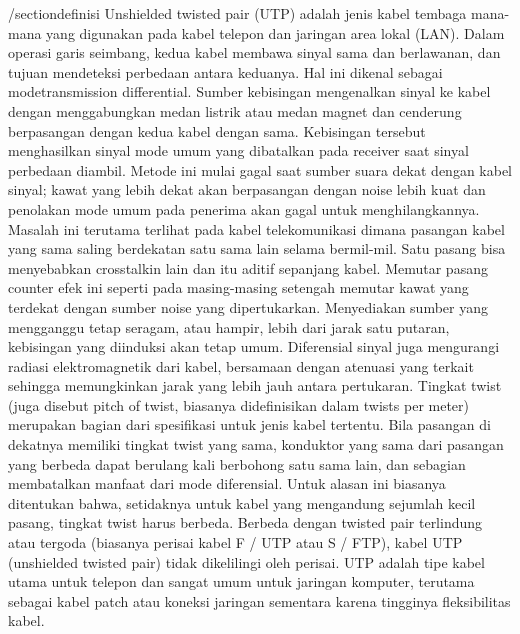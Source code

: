 /section{definisi}
Unshielded twisted pair (UTP) adalah jenis kabel tembaga mana-mana yang digunakan pada kabel telepon dan jaringan area lokal (LAN).
Dalam operasi garis seimbang, kedua kabel membawa sinyal sama dan berlawanan, dan tujuan mendeteksi perbedaan antara keduanya. Hal ini dikenal sebagai modetransmission differential. Sumber kebisingan mengenalkan sinyal ke kabel dengan menggabungkan medan listrik atau medan magnet dan cenderung berpasangan dengan kedua kabel dengan sama. Kebisingan tersebut menghasilkan sinyal mode umum yang dibatalkan pada receiver saat sinyal perbedaan diambil. Metode ini mulai gagal saat sumber suara dekat dengan kabel sinyal; kawat yang lebih dekat akan berpasangan dengan noise lebih kuat dan penolakan mode umum pada penerima akan gagal untuk menghilangkannya. Masalah ini terutama terlihat pada kabel telekomunikasi dimana pasangan kabel yang sama saling berdekatan satu sama lain selama bermil-mil. Satu pasang bisa menyebabkan crosstalkin lain dan itu aditif sepanjang kabel. Memutar pasang counter efek ini seperti pada masing-masing setengah memutar kawat yang terdekat dengan sumber noise yang dipertukarkan. Menyediakan sumber yang mengganggu tetap seragam, atau hampir, lebih dari jarak satu putaran, kebisingan yang diinduksi akan tetap umum. Diferensial sinyal juga mengurangi radiasi elektromagnetik dari kabel, bersamaan dengan atenuasi yang terkait sehingga memungkinkan jarak yang lebih jauh antara pertukaran. Tingkat twist (juga disebut pitch of twist, biasanya didefinisikan dalam twists per meter) merupakan bagian dari spesifikasi untuk jenis kabel tertentu. Bila pasangan di dekatnya memiliki tingkat twist yang sama, konduktor yang sama dari pasangan yang berbeda dapat berulang kali berbohong satu sama lain, dan sebagian membatalkan manfaat dari mode diferensial. Untuk alasan ini biasanya ditentukan bahwa, setidaknya untuk kabel yang mengandung sejumlah kecil pasang, tingkat twist harus berbeda. Berbeda dengan twisted pair terlindung atau tergoda (biasanya perisai kabel F / UTP atau S / FTP), kabel UTP (unshielded twisted pair) tidak dikelilingi oleh perisai. UTP adalah tipe kabel utama untuk telepon dan sangat umum untuk jaringan komputer, terutama sebagai kabel patch atau koneksi jaringan sementara karena tingginya fleksibilitas kabel.

